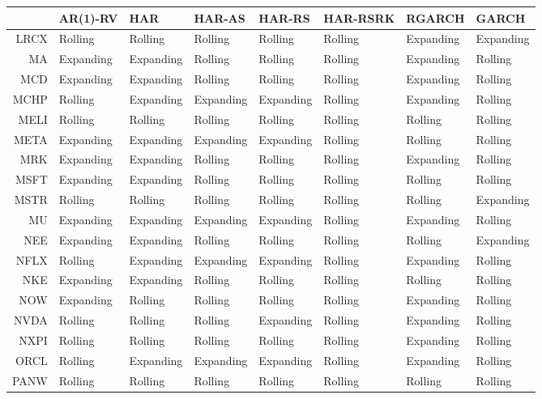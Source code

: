 \begin{table}[ht]
\centering
\begin{tabular}{rlllllll}
  \hline
 & AR(1)-RV & HAR & HAR-AS & HAR-RS & HAR-RSRK & RGARCH & GARCH \\ 
  \hline
LRCX & Rolling & Rolling & Rolling & Rolling & Rolling & Expanding & Expanding \\ 
  MA & Expanding & Expanding & Rolling & Rolling & Rolling & Expanding & Rolling \\ 
  MCD & Expanding & Expanding & Rolling & Rolling & Rolling & Expanding & Rolling \\ 
  MCHP & Rolling & Expanding & Expanding & Expanding & Rolling & Expanding & Rolling \\ 
  MELI & Rolling & Rolling & Rolling & Rolling & Rolling & Rolling & Rolling \\ 
  META & Expanding & Expanding & Expanding & Expanding & Rolling & Rolling & Rolling \\ 
  MRK & Expanding & Expanding & Rolling & Rolling & Rolling & Expanding & Rolling \\ 
  MSFT & Expanding & Expanding & Rolling & Rolling & Rolling & Rolling & Rolling \\ 
  MSTR & Rolling & Rolling & Rolling & Rolling & Rolling & Rolling & Expanding \\ 
  MU & Expanding & Expanding & Expanding & Expanding & Rolling & Expanding & Rolling \\ 
  NEE & Expanding & Expanding & Rolling & Rolling & Rolling & Rolling & Expanding \\ 
  NFLX & Rolling & Expanding & Expanding & Expanding & Rolling & Expanding & Rolling \\ 
  NKE & Expanding & Expanding & Rolling & Rolling & Rolling & Rolling & Rolling \\ 
  NOW & Expanding & Rolling & Rolling & Rolling & Rolling & Expanding & Rolling \\ 
  NVDA & Rolling & Rolling & Rolling & Expanding & Rolling & Expanding & Rolling \\ 
  NXPI & Rolling & Rolling & Rolling & Rolling & Rolling & Expanding & Rolling \\ 
  ORCL & Rolling & Expanding & Expanding & Expanding & Rolling & Expanding & Rolling \\ 
  PANW & Rolling & Rolling & Rolling & Rolling & Rolling & Rolling & Rolling \\ 

\end{tabular}
\end{table}
